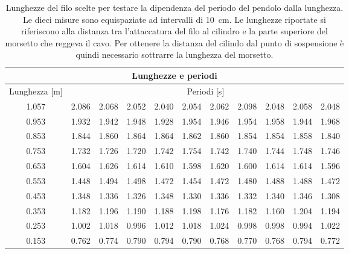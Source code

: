 \begin{table}
    \centering
    \begin{tabular}{c c c c c c c c c c c}
        \multicolumn{11}{c}{\textbf{Lunghezze e periodi}} \\
        \toprule
        Lunghezza [m] & \multicolumn{10}{c}{Periodi [s]} \\
        \midrule
        1.057 & 2.086 & 2.068 & 2.052 & 2.040 & 2.054 & 2.062 & 2.098 & 2.048 & 2.058 & 2.048 \\
        0.953 & 1.932 & 1.942 & 1.948 & 1.928 & 1.954 & 1.946 & 1.954 & 1.958 & 1.944 & 1.968 \\
        0.853 & 1.844 & 1.860 & 1.864 & 1.864 & 1.862 & 1.860 & 1.854 & 1.854 & 1.858 & 1.840 \\
        0.753 & 1.732 & 1.726 & 1.720 & 1.742 & 1.754 & 1.742 & 1.740 & 1.744 & 1.748 & 1.746 \\
        0.653 & 1.604 & 1.626 & 1.614 & 1.610 & 1.598 & 1.620 & 1.600 & 1.614 & 1.614 & 1.596 \\
        0.553 & 1.448 & 1.494 & 1.498 & 1.472 & 1.454 & 1.472 & 1.480 & 1.488 & 1.488 & 1.472 \\
        0.453 & 1.348 & 1.336 & 1.326 & 1.348 & 1.330 & 1.336 & 1.332 & 1.340 & 1.346 & 1.308 \\
        0.353 & 1.182 & 1.196 & 1.190 & 1.188 & 1.198 & 1.176 & 1.182 & 1.160 & 1.204 & 1.194 \\
        0.253 & 1.002 & 1.018 & 0.996 & 1.012 & 1.018 & 1.024 & 0.998 & 0.998 & 0.994 & 1.022 \\
        0.153 & 0.762 & 0.774 & 0.790 & 0.794 & 0.790 & 0.768 & 0.770 & 0.768 & 0.794 & 0.772 \\
        \bottomrule
    \end{tabular}
    \caption{Lunghezze del filo scelte per testare la dipendenza del periodo
        del pendolo dalla lunghezza. Le dieci misure sono equispaziate ad intervalli di \SI{10}{\centi\metre}.
        Le lunghezze riportate si riferiscono alla distanza tra l'attaccatura del filo al cilindro e la parte superiore
        del morsetto che reggeva il cavo. Per ottenere la distanza del cilindo dal punto di sospensione è quindi
        necessario sottrarre la lunghezza del morsetto.}
    \label{tab:lunghezze_periodi}
\end{table}

